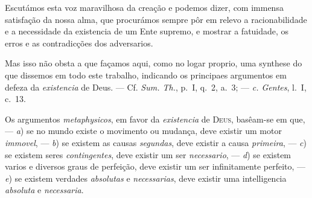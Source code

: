 {Escutámos esta voz maravilhosa da creação e podemos dizer, com immensa satisfação da
nossa alma, que procurámos sempre pôr em relevo a racionabilidade e a necessidade da
existencia de um Ente supremo, e mostrar a fatuidade, os erros e as contradicções dos
adversarios.

Mas isso não obsta a que façamos aqui, como no logar proprio, uma synthese do que
dissemos em todo este trabalho, indicando os principaes argumentos em defeza da
\emph{existencia} de Deus. --- Cf. \emph{Sum. Th.}, p.~I, q.~2, a.~3; --- \emph{c.
Gentes}, l.~I, c.~13.}

Os argumentos \emph{metaphysicos}, em favor da \emph{existencia} de \textsc{Deus},
basêam-se em que, --- \emph{a}) se no mundo existe o movimento ou mudança, deve existir
um motor \emph{immovel}, --- \emph{b}) se existem as causas \emph{segundas}, deve
existir a causa \emph{primeira}, --- \emph{c}) se existem seres \emph{contingentes},
deve existir um ser \emph{necessario}, --- \emph{d}) se existem varios e diversos graus
de perfeição, deve existir um ser infinitamente perfeito, --- \emph{e}) se existem
verdades \emph{absolutas} e \emph{necessarias}, deve existir uma intelligencia
\emph{absoluta} e \emph{necessaria}.

